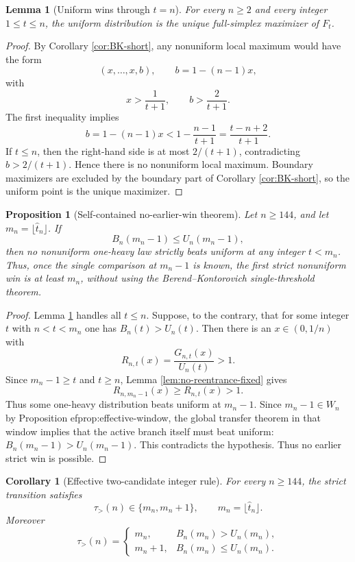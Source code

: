 \documentclass[11pt]{article}
\newtheorem{lemma}[theorem]{Lemma}
\newtheorem{proposition}[theorem]{Proposition}
\newtheorem{corollary}[theorem]{Corollary}
\theoremstyle{definition}
\begin{document}
\begin{lemma}[Uniform wins through $t=n$]\label{lem:uniform-through-n}
For every $n\ge2$ and every integer $1\le t\le n$, the uniform distribution is the unique full-simplex maximizer of $F_t$.
\end{lemma}

\begin{proof}
By Corollary \ref{cor:BK-short}, any nonuniform local maximum would have the form
\[
  (x,\ldots,x,b),
  \qquad b=1-(n-1)x,
\]
with
\[
  x>\frac{1}{t+1},
  \qquad
  b>\frac{2}{t+1}.
\]
The first inequality implies
\[
  b=1-(n-1)x<1-\frac{n-1}{t+1}=\frac{t-n+2}{t+1}.
\]
If $t\le n$, then the right-hand side is at most $2/(t+1)$, contradicting $b>2/(t+1)$.  Hence there is no nonuniform local maximum. Boundary maximizers are excluded by the boundary part of Corollary \ref{cor:BK-short}, so the uniform point is the unique maximizer.
\end{proof}

\begin{proposition}[Self-contained no-earlier-win theorem]\label{prop:no-earlier-win-proved}
Let $n\ge144$, and let $m_n=\lfloor\widehat t_n\rfloor$.  If
\[
  B_n(m_n-1)\le U_n(m_n-1),
\]
then no nonuniform one-heavy law strictly beats uniform at any integer $t<m_n$.  Thus, once the single comparison at $m_n-1$ is known, the first strict nonuniform win is at least $m_n$, without using the Berend--Kontorovich single-threshold theorem.
\end{proposition}

\begin{proof}
Lemma \ref{lem:uniform-through-n} handles all $t\le n$.  Suppose, to the contrary, that for some integer $t$ with $n<t<m_n$ one has $B_n(t)>U_n(t)$.  Then there is an $x\in(0,1/n)$ with
\[
  R_{n,t}(x)=\frac{G_{n,t}(x)}{U_n(t)}>1.
\]
Since $m_n-1\ge t$ and $t\ge n$, Lemma \ref{lem:no-reentrance-fixed} gives
\[
  R_{n,m_n-1}(x)\ge R_{n,t}(x)>1.
\]
Thus some one-heavy distribution beats uniform at $m_n-1$.  Since $m_n-1\in W_n$ by Proposition 
ef{prop:effective-window}, the global transfer theorem in that window implies that the active branch itself must beat uniform: $B_n(m_n-1)>U_n(m_n-1)$.  This contradicts the hypothesis.  Thus no earlier strict win is possible.
\end{proof}
\begin{corollary}[Effective two-candidate integer rule]\label{cor:effective-integer}
For every $n\ge144$, the strict transition satisfies
\[
  \tau_>(n)\in\{m_n,m_n+1\},
  \qquad m_n=\lfloor\widehat t_n\rfloor.
\]
Moreover
\[
  \tau_>(n)=
  \begin{cases}
  m_n, & B_n(m_n)>U_n(m_n),\\[1mm]
  m_n+1, & B_n(m_n)\le U_n(m_n).
  \end{cases}
\]
\end{corollary}
\end{document}
